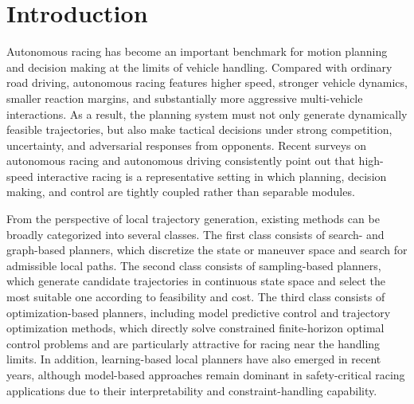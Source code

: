 \documentclass[final ,3p, times]{elsarticle}
\begin{document}
\maketitle



\section{Introduction}

Autonomous racing has become an important benchmark for motion planning and decision making at the limits of vehicle handling. Compared with ordinary road driving, autonomous racing features higher speed, stronger vehicle dynamics, smaller reaction margins, and substantially more aggressive multi-vehicle interactions. As a result, the planning system must not only generate dynamically feasible trajectories, but also make tactical decisions under strong competition, uncertainty, and adversarial responses from opponents. Recent surveys on autonomous racing and autonomous driving consistently point out that high-speed interactive racing is a representative setting in which planning, decision making, and control are tightly coupled rather than separable modules. \cite{liniger2021survey,hu2025survey,reda2024path}

From the perspective of local trajectory generation, existing methods can be broadly categorized into several classes. The first class consists of search- and graph-based planners, which discretize the state or maneuver space and search for admissible local paths. The second class consists of sampling-based planners, which generate candidate trajectories in continuous state space and select the most suitable one according to feasibility and cost. The third class consists of optimization-based planners, including model predictive control and trajectory optimization methods, which directly solve constrained finite-horizon optimal control problems and are particularly attractive for racing near the handling limits. In addition, learning-based local planners have also emerged in recent years, although model-based approaches remain dominant in safety-critical racing applications due to their interpretability and constraint-handling capability. \cite{reda2024path,hu2025survey,liniger2021survey,turner2025local} 
\end{document}
